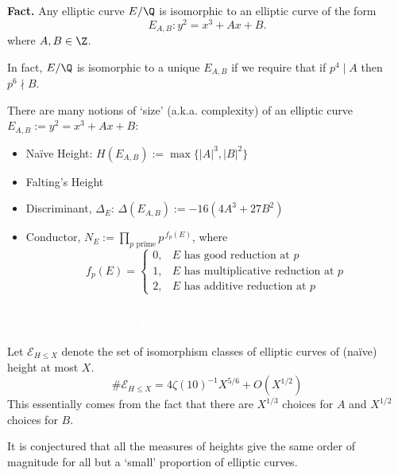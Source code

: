 \begin{frame}
\textbf{Fact.} Any elliptic curve $E/\Q$ is isomorphic to an elliptic curve of the form
	\[
	E_{A,B} \colon y^2= x^3 + Ax + B.
	\] 
where $A,B \in \Z$. \pause \par\vspace{0.5cm}

In fact, $E/\Q$ is isomorphic to a unique $E_{A,B}$ if we require that if $p^4 \mid A$ then $p^6 \nmid B$. 
\end{frame}


\begin{frame}
There are many notions of `size' (a.k.a. complexity) of an elliptic curve $E_{A,B}:= y^2= x^3+Ax+B$: \par\vspace{0.3cm}
	\begin{itemize}
	\item Na\"ive Height: $H(E_{A,B}):= \max\{|A|^3,|B|^2\}$  \vfill
	\item Falting's Height \vfill
	\item Discriminant, $\Delta_E$: $\Delta(E_{A,B}):= -16(4A^3 + 27B^2)$ \vfill
	\item Conductor, $N_E:= \prod_{p \text{ prime}} p^{\,f_p(E)}$, where
		\[
		f_p(E)= \begin{cases}
		0, & E \text{ has good reduction at } p \\
		1, & E \text{ has multiplicative reduction at }p \\
		2, & E \text{ has additive reduction at }p
		\end{cases}
		\] \vfill
	\end{itemize}
\end{frame}



\begin{frame}
\frametitle{\textcolor{white}{Advantage of Na\"ive Height}}
Let $\mathcal{E}_{H \leq X}$ denote the set of isomorphism classes of elliptic curves of (na\"ive) height at most $X$. \pause 
	\[
	\#\mathcal{E}_{H \leq X} = 4 \zeta(10)^{-1} X^{5/6} + O(X^{1/2})
	\]  \pause
This essentially comes from the fact that there are $X^{1/3}$ choices for $A$ and $X^{1/2}$ choices for $B$. \pause \par\vspace{0.5cm}

It is conjectured that all the measures of heights give the same order of magnitude for all but a `small' proportion of elliptic curves. 
\end{frame}



